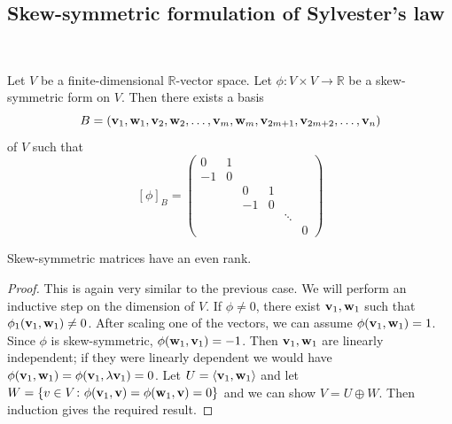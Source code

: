 \documentclass[a4paper]{article}
\begin{document}
\subsection{Skew-symmetric formulation of Sylvester's law}
\ \vspace*{-1.5em}
\begin{theorem}
	Let \( V \) be a finite-dimensional \( \mathbb R \)-vector space.
	Let \( \phi \colon V \times V \to \mathbb R \) be a skew-symmetric form on \( V \).
	Then there exists a basis
	\[
		B = ({\bf v}_1, {\bf w}_1, {\bf v}_2, {\bf w}_2, \dots, {\bf v}_m, {\bf w}_m, {\bf v}_{2m+1}, {\bf v}_{2m+2}, \dots, {\bf v}_n)
	\]
	of \( V \) such that
	\[
		[\phi]_B = \begin{pmatrix}
			0  & 1                       \\
			-1 & 0                       \\
			   &   & 0  & 1              \\
			   &   & -1 & 0              \\
			   &   &    &   & \ddots     \\
			   &   &    &   &        & 0
		\end{pmatrix}
	\]
\end{theorem}
\begin{corollary}
	Skew-symmetric matrices have an even rank.
\end{corollary}
\begin{proof}
	This is again very similar to the previous case.
	We will perform an inductive step on the dimension of \( V \).
	If \( \phi \neq 0 \), there exist \( {\bf v}_1, {\bf w}_1 \) such that \( \phi_1({\bf v}_1, {\bf w}_1) \neq 0 \).
	After scaling one of the vectors, we can assume \( \phi({\bf v}_1, {\bf w}_1) = 1 \).
	Since \( \phi \) is skew-symmetric, \( \phi({\bf w}_1, {\bf v}_1) = -1 \).
	Then \( {\bf v}_1, {\bf w}_1 \) are linearly independent; if they were linearly dependent we would have \( \phi({\bf v}_1, {\bf w}_1) = \phi({\bf v}_1, \lambda {\bf v}_1) = 0 \).
	Let \( U = \left\langle{} {\bf v}_1, {\bf w}_1 \right\rangle \) and let \( W = \qty{v \in V \colon \phi({\bf v}_1, {\bf v}) = \phi({\bf w}_1, {\bf v}) = 0} \) and we can show \( V = U \oplus W \).
	Then induction gives the required result.
\end{proof}
\end{document}
